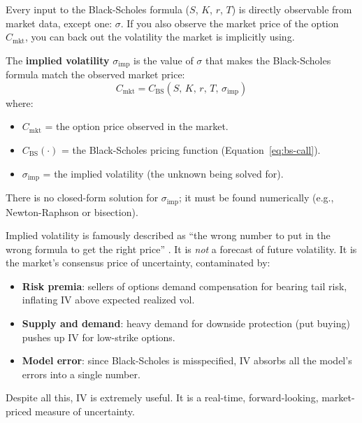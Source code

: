 Every input to the Black-Scholes formula ($S$, $K$, $r$, $T$) is directly observable from market data, except one: $\sigma$.
If you also observe the market price of the option $C_{\text{mkt}}$, you can back out the volatility the market is implicitly using.

\begin{definition}
\label{def:implied-vol}
The \textbf{implied volatility} $\sigma_{\text{imp}}$ is the value of $\sigma$ that makes the Black-Scholes formula match the observed market price:
\begin{equation}
  C_{\text{mkt}} = C_{\text{BS}}(S,\, K,\, r,\, T,\, \sigma_{\text{imp}})
  \label{eq:iv-definition}
\end{equation}
where:
\begin{itemize}[nosep]
  \item $C_{\text{mkt}}$ = the option price observed in the market.
  \item $C_{\text{BS}}(\cdot)$ = the Black-Scholes pricing function (Equation~\ref{eq:bs-call}).
  \item $\sigma_{\text{imp}}$ = the implied volatility (the unknown being solved for).
\end{itemize}
There is no closed-form solution for $\sigma_{\text{imp}}$; it must be found numerically (e.g., Newton-Raphson or bisection).
\end{definition}

\begin{intuition}
Implied volatility is famously described as ``the wrong number to put in the wrong formula to get the right price'' \citep{Rebonato2004}.
It is \emph{not} a forecast of future volatility.
It is the market's consensus price of uncertainty, contaminated by:
\begin{itemize}[nosep]
  \item \textbf{Risk premia}: sellers of options demand compensation for bearing tail risk, inflating IV above expected realized vol.
  \item \textbf{Supply and demand}: heavy demand for downside protection (put buying) pushes up IV for low-strike options.
  \item \textbf{Model error}: since Black-Scholes is misspecified, IV absorbs all the model's errors into a single number.
\end{itemize}
Despite all this, IV is extremely useful. It is a real-time, forward-looking, market-priced measure of uncertainty.
\end{intuition}

